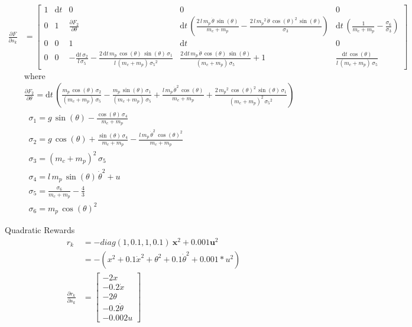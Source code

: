 \documentclass{article}
\theoremstyle{definition} %
\begin{document}
\begin{align*}
    \frac{\partial F}{\partial s_k} 
    &= 
    \left[\begin{array}{ccccc}
    1 & \mathrm{d}t & 0 & 0 & 0\\
    0 & 1 & \frac{\partial F_2}{\partial \theta} & \mathrm{d}t\,{\left(\frac{2\,l\,m_p \,\dot{\theta} \,\sin \left(\theta \right)}{m_c +m_p }-\frac{2\,l\,{m_p }^2 \,\dot{\theta} \,{\cos \left(\theta \right)}^2 \,\sin \left(\theta \right)}{\sigma_3 }\right)} & \mathrm{d}t\,{\left(\frac{1}{m_c +m_p }-\frac{\sigma_6 }{\sigma_3 }\right)}\\
    0 & 0 & 1 & \mathrm{d}t & 0\\
    0 & 0 & -\frac{\mathrm{d}t\,\sigma_2 }{l\,\sigma_5 }-\frac{2\,\mathrm{d}t\,m_p \,\cos \left(\theta \right)\,\sin \left(\theta \right)\,\sigma_1 }{l\,{\left(m_c +m_p \right)}\,{\sigma_5 }^2 } & \frac{2\,\mathrm{d}t\,m_p \,\dot{\theta} \,\cos \left(\theta \right)\,\sin \left(\theta \right)}{{\left(m_c +m_p \right)}\,\sigma_5 }+1 & \frac{\mathrm{d}t\,\cos \left(\theta \right)}{l\,{\left(m_c +m_p \right)}\,\sigma_5 }
    \end{array}\right]\\
    &\text{where}\\
    &\frac{\partial F_2}{\partial \theta} = \mathrm{d}t\,{\left(\frac{m_p \,\cos \left(\theta \right)\,\sigma_2 }{{\left(m_c +m_p \right)}\,\sigma_5 }-\frac{m_p \,\sin \left(\theta \right)\,\sigma_1 }{{\left(m_c +m_p \right)}\,\sigma_5 }+\frac{l\,m_p \,{\dot{\theta} }^2 \,\cos \left(\theta \right)}{m_c +m_p }+\frac{2\,{m_p }^2 \,{\cos \left(\theta \right)}^2 \,\sin \left(\theta \right)\,\sigma_1 }{{{\left(m_c +m_p \right)}}^2 \,{\sigma_5 }^2 }\right)}\\
    &\;\;\sigma_1 =g\,\sin \left(\theta \right)-\frac{\cos \left(\theta \right)\,\sigma_4 }{m_c +m_p }\\
    &\;\;\sigma_2 =g\,\cos \left(\theta \right)+\frac{\sin \left(\theta \right)\,\sigma_4 }{m_c +m_p }-\frac{l\,m_p \,{\dot{\theta} }^2 \,{\cos \left(\theta \right)}^2 }{m_c +m_p }\\
    &\;\;\sigma_3 ={{\left(m_c +m_p \right)}}^2 \,\sigma_5 \\
    &\;\;\sigma_4 =l\,m_p \,\sin \left(\theta \right)\,{\dot{\theta} }^2 +u\\
    &\;\;\sigma_5 =\frac{\sigma_6 }{m_c +m_p }-\frac{4}{3}\\
    &\;\;\sigma_6 =m_p \,{\cos \left(\theta \right)}^2 
\end{align*}


Quadratic Rewards
\begin{align*}
    r_k 
    &=-diag(1, 0.1, 1, 0.1)\ \mathbf{x}^2 + 0.001 \mathbf{u}^2\\
    &= -(x^2 + 0.1\dot{x}^2 + \theta^2 + 0.1\dot\theta^2 + 0.001*u^2)\\
    \frac{\partial r_k}{\partial s_k}
    &= 
    \begin{bmatrix}
        -2x\\
        -0.2\dot{x}\\
        -2\theta\\
        -0.2\dot{\theta}\\
        -0.002u
    \end{bmatrix}
\end{align*}
\end{document}
